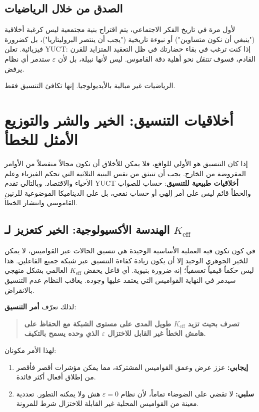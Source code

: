 \documentclass[12pt,a4paper]{article}
\begin{document}
	\subsection{الصدق من خلال الرياضيات}
	
	لأول مرة في تاريخ الفكر الاجتماعي، يتم اقتراح بنية مجتمعية ليس كرغبة أخلاقية ("ينبغي أن نكون متساوين") أو نبوءة تاريخية ("يجب أن ينتصر البروليتاريا")، بل كضرورة فيزيائية. تعلن YUCT: إذا كنت ترغب في بقاء حضارتك في ظل التعقيد المتزايد للقرن القادم، فسوف \emph{تنتقل} نحو أهلية دقة القاموس. ليس لأنها نبيلة، بل لأن \(\varepsilon\) ستدمر أي نظام يرفض.
	
	الرياضيات غير مبالية بالأيديولوجيا. إنها تكافئ التنسيق فقط.
	
	\section{أخلاقيات التنسيق: الخير والشر والتوزيع الأمثل للخطأ}
	\label{sec:coordination-ethics}
	
	إذا كان التنسيق هو الأولي للواقع، فلا يمكن للأخلاق أن تكون مجالاً منفصلاً من الأوامر المفروضة من الخارج. يجب أن تنبثق من نفس البنية الثلاثية التي تحكم الفيزياء وعلم الأحياء والاقتصاد. وبالتالي تقدم YUCT \textbf{أخلاقيات طبيعية للتنسيق}: حساب للصواب والخطأ قائم ليس على أمر إلهي أو حساب نفعي، بل على الديناميكا الموضوعية للرنين القاموسي وانتشار الخطأ.
	
	\subsection{الهندسة الأكسيولوجية: الخير كتعزيز لـ \(K_{\mathrm{eff}}\)}
	
	في كون تكون فيه العملية الأساسية الوحيدة هي تنسيق الحالات عبر القواميس، لا يمكن للخير الجوهري الوحيد إلا أن يكون زيادة كفاءة التنسيق عبر شبكة جميع الفاعلين. هذا ليس حكماً قيمياً تعسفياً؛ إنه ضرورة بنيوية. أي فاعل يخفض \(K_{\mathrm{eff}}\) العالمي بشكل منهجي سيدمر في النهاية القواميس التي يعتمد عليها وجوده. يعاقب النظام عدم التنسيق بالانقراض.
	
	لذلك نعرّف \textbf{أمر التنسيق}:
	
	\begin{quote}
		\textbf{تصرف بحيث تزيد \(K_{\mathrm{eff}}\) طويل المدى على مستوى الشبكة مع الحفاظ على هامش الخطأ غير القابل للاختزال \(\varepsilon\) الذي وحده يسمح بالتكيف.}
	\end{quote}
	
	لهذا الأمر مكونان:
	\begin{enumerate}[leftmargin=*]
		\item \textbf{إيجابي:} عزز عرض وعمق القواميس المشتركة، مما يمكن مؤشرات أقصر فأقصر من إطلاق أفعال أكثر فائدة.
		\item \textbf{سلبي:} لا تقضي على الضوضاء تماماً، لأن نظام \(\varepsilon = 0\) هش ولا يمكنه التطور. تعددية معينة من القواميس المحلية غير القابلة للاختزال شرط للمرونة.
	\end{enumerate}
	
\end{document}

